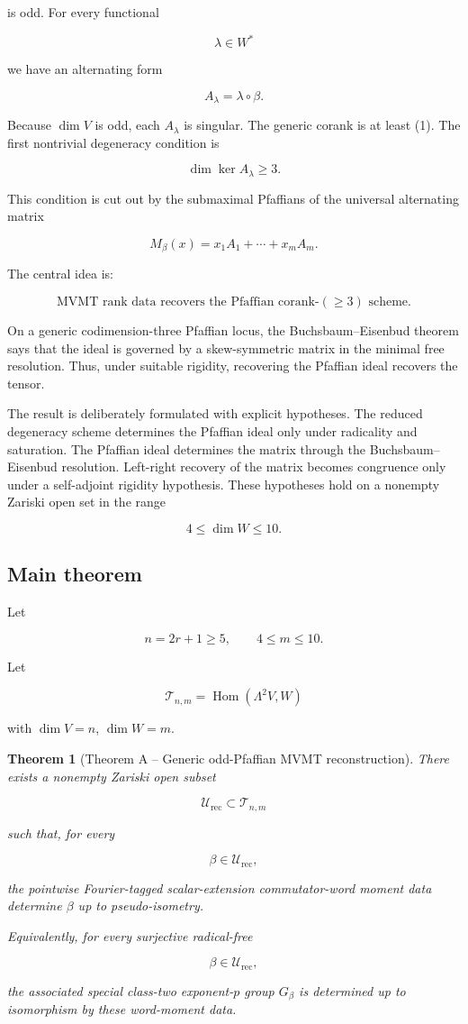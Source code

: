 \documentclass[11pt]{article}
\newtheorem{theorem}{Theorem}[section]
\begin{document}
is odd. For every functional

\[
\lambda\in W^*
\]

we have an alternating form

\[
A_\lambda=\lambda\circ\beta.
\]

Because $\dim V$ is odd, each $A_\lambda$ is singular. The generic corank is at least (1). The first nontrivial degeneracy condition is

\[
\dim\ker A_\lambda\ge3.
\]

This condition is cut out by the submaximal Pfaffians of the universal alternating matrix

\[
M_\beta(x)=x_1A_1+\cdots+x_mA_m.
\]

The central idea is:

\[
\boxed{
\text{MVMT rank data recovers the Pfaffian corank-}(\ge3)\text{ scheme.}
}
\]

On a generic codimension-three Pfaffian locus, the Buchsbaum--Eisenbud theorem says that the ideal is governed by a skew-symmetric matrix in the minimal free resolution. Thus, under suitable rigidity, recovering the Pfaffian ideal recovers the tensor.

The result is deliberately formulated with explicit hypotheses. The reduced degeneracy scheme determines the Pfaffian ideal only under radicality and saturation. The Pfaffian ideal determines the matrix through the Buchsbaum--Eisenbud resolution. Left-right recovery of the matrix becomes congruence only under a self-adjoint rigidity hypothesis. These hypotheses hold on a nonempty Zariski open set in the range

\[
4\le \dim W\le10.
\]

\subsection{Main theorem}

Let

\[
n=2r+1\ge5,\qquad 4\le m\le10.
\]

Let

\[
\mathcal T_{n,m}=\operatorname{Hom}(\Lambda^2V,W)
\]

with $\dim V=n$, $\dim W=m$.

\begin{theorem}[Theorem A -- Generic odd-Pfaffian MVMT reconstruction]

There exists a nonempty Zariski open subset

\[
\mathcal U_{\mathrm{rec}}\subset \mathcal T_{n,m}
\]

such that, for every

\[
\beta\in\mathcal U_{\mathrm{rec}},
\]

the pointwise Fourier-tagged scalar-extension commutator-word moment data determine $\beta$ up to pseudo-isometry.

Equivalently, for every surjective radical-free

\[
\beta\in\mathcal U_{\mathrm{rec}},
\]

the associated special class-two exponent-$p$ group $G_\beta$ is determined up to isomorphism by these word-moment data.

\end{theorem}
\end{document}
